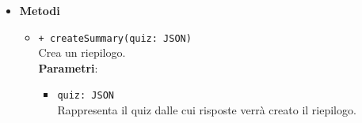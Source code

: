 \begin{itemize}
\begin{itemize}
\begin{itemize}
				\end{itemize}
		\end{itemize}
	\item \textbf{Metodi}
		\begin{itemize}
			\item \texttt{+ createSummary(quiz: JSON)}\\
			Crea un riepilogo.\\
			\textbf{Parametri}:
			\begin{itemize}
				\item \texttt{quiz: JSON}\\
				Rappresenta il quiz dalle cui risposte verrà creato il riepilogo.
			\end{itemize}
		\end{itemize}
\end{itemize}
